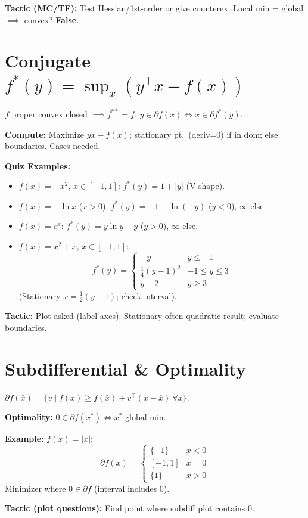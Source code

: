 \textbf{Tactic (MC/TF):} Test Hessian/1st-order or give counterex.
Local min = global \(\implies\) convex? \textbf{False}.

\section*{Conjugate \(f^*(y)=\sup_x(y^\top x - f(x))\)}
\(f\) proper convex closed \(\implies f^{**}=f\). \(y\in\partial
f(x)\iff x\in\partial f^*(y)\).

\textbf{Compute:} Maximize \(yx-f(x)\); stationary pt.\ (deriv=0) if
in dom; else boundaries. Cases needed.

\textbf{Quiz Examples:}
\begin{itemize}
  \item \(f(x)=-x^2\), \(x\in[-1,1]\): \(f^*(y)=1+|y|\) (V-shape).
  \item \(f(x)=-\ln x\) (\(x>0\)): \(f^*(y)=-1-\ln(-y)\) (\(y<0\)),
    \(\infty\) else.
  \item \(f(x)=e^x\): \(f^*(y)=y\ln y - y\) (\(y>0\)), \(\infty\) else.
  \item \(f(x)=x^2+x\), \(x\in[-1,1]\):
    \[
      f^*(y)=
      \begin{cases}
        -y & y\le-1\\
        \frac14(y-1)^2 & -1\le y\le3\\
        y-2 & y\ge3
      \end{cases}
    \]
    (Stationary \(x=\frac12(y-1)\); check interval).
\end{itemize}

\textbf{Tactic:} Plot asked (label axes). Stationary often quadratic
result; evaluate boundaries.

\section*{Subdifferential \& Optimality}
\(\partial f(\bar x)=\{v\mid f(x)\ge f(\bar x)+v^\top(x-\bar x)\ \forall x\}\).

\textbf{Optimality:} \(0\in\partial f(x^*)\iff x^*\) global min.

\textbf{Example:} \(f(x)=|x|\):
\[
  \partial f(x)=
  \begin{cases}
    \{-1\} & x<0\\
    [-1,1] & x=0\\
    \{1\} & x>0
  \end{cases}
\]
Minimizer where \(0\in\partial f\) (interval includes 0).

\textbf{Tactic (plot questions):} Find point where subdiff plot contains 0.

